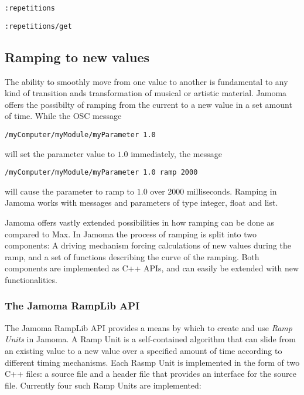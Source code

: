 \documentclass{sig-alternate}
\begin{document}
\texttt{:repetitions}

\texttt{:repetitions/get}



\subsection{Ramping to new values} %
\label{sub:ramping_to_new_values}

The ability to smoothly move from one value to another is fundamental to any kind of transition ands transformation of musical or artistic material. Jamoma offers the possibilty of ramping from the current to a new value in a set amount of time. While the OSC message

\texttt{/myComputer/myModule/myParameter 1.0}

will set the parameter value to $1.0$ immediately, the message

\texttt{/myComputer/myModule/myParameter 1.0 ramp 2000}

will cause the parameter to ramp to $1.0$ over 2000 milliseconds. Ramping in Jamoma works with messages and parameters of type integer, float and list.

Jamoma offers vastly extended possibilities in how ramping can be done as compared to Max. In Jamoma the process of ramping is split into two components: A driving mechanism forcing calculations of new values during the ramp, and a set of functions describing the curve of the ramping. Both components are implemented as C++ APIs, and can easily be extended with new functionalities.

\subsubsection{The Jamoma RampLib API} %
\label{ssub:the_ramp_lib}

The Jamoma RampLib API provides a means by which to create and use \emph{Ramp Units} in Jamoma.  A Ramp Unit is a self-contained algorithm that can slide from an existing value to a new value over a specified amount of time according to different timing mechanisms. Each Rasmp Unit is implemented in the form of two C++ files: a source file and a header file that provides an interface for the source file. Currently four such Ramp Units are implemented:
\end{document}
